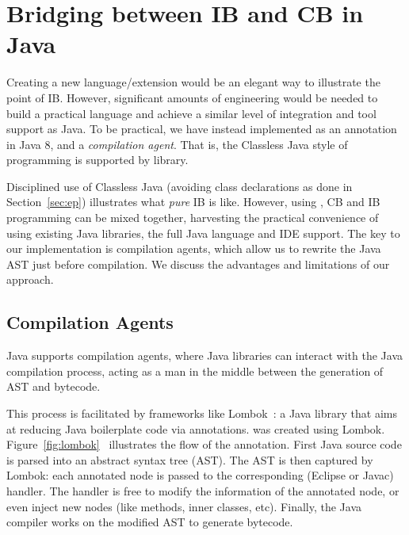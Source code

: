 \section{Bridging between IB and CB in Java}\label{sec:imp}


Creating a new language/extension would be an
elegant way to illustrate the point of IB. However,
significant amounts of engineering would be needed to build a practical
language and achieve a similar level of integration and tool support
as Java. To be practical, %
we have instead implemented
\mixin as an annotation in Java 8, and a \emph{compilation agent}.
That is, the Classless Java style of programming
is supported by library.

Disciplined use of Classless Java (avoiding class
declarations as done in Section~\ref{sec:ep}) illustrates what \emph{pure} IB is like.
However, using \mixin, CB and IB programming can be mixed together,
harvesting the practical convenience of using existing Java libraries, the full
Java language and IDE support.
The key to our implementation is compilation agents, which
 allow us to rewrite the Java AST just
before compilation. We discuss the advantages and limitations of our approach.

\subsection{Compilation Agents}
Java supports compilation agents, where Java libraries can interact with the Java compilation process,
acting as a man in the middle between the
generation of AST and bytecode.

This process is facilitated by frameworks like Lombok~\cite{lombok}:
a Java library that aims at reducing Java boilerplate code via
annotations. \mixin was created using Lombok.
Figure~\ref{fig:lombok}~\cite{neildo2011blog} illustrates the flow of
the \mixin annotation.
First Java source code is parsed into an abstract syntax tree (AST).
The AST is then captured by Lombok:
each annotated node is passed to
the corresponding (Eclipse or Javac) handler. The handler is
free to modify the information of the annotated node, or even inject new nodes (like methods, inner classes,
etc). Finally, the Java compiler works on the modified AST to generate bytecode.


